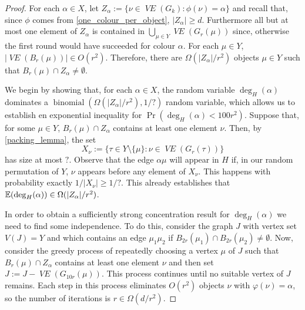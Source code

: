 \documentclass{patmorin}
\DeclareMathOperator{\binomial}{binomial}
\DeclareMathOperator{\VE}{\mathit{VE}}
\begin{document}
\begin{proof}
  For each $\alpha\in X$, let $Z_\alpha:=\{\nu\in\VE(G_k):\phi(\nu)=\alpha\}$ and recall that, since $\phi$ comes from \cref{one_colour_per_object}, $|Z_\alpha| \ge d$.  Furthermore all but at most one element of $Z_\alpha$ is contained in $\bigcup_{\mu\in Y}\VE(G_r(\mu))$ since, otherwise the first round would have succeeded for colour $\alpha$.  For each $\mu\in Y$, $|\VE(B_r(\mu))|\in O(r^2)$. Therefore, there are $\Omega(|Z_\alpha|/r^2)$ objects $\mu\in Y$ such that $B_r(\mu)\cap Z_\alpha\neq\emptyset$.

  We begin by showing that, for each $\alpha\in X$, the random variable $\deg_H(\alpha)$ dominates a $\binomial(\Omega(|Z_\alpha|/r^2),1/?)$ random variable, which allows us to establish en exponential inequality for $\Pr(\deg_H(\alpha) < 100r^2)$.
  Suppose that, for some $\mu\in Y$, $B_r(\mu)\cap Z_\alpha$ contains at least one element $\nu$. Then, by \cref{packing_lemma}, the set
  \[
     X_\nu := \{\tau\in Y\setminus\{\mu\}:\nu\in\VE(G_r(\tau))\}
  \]
  has size at most $?$. Observe that the edge $\alpha\mu$ will appear in $H$ if, in our random permutation of $Y$, $\nu$ appears before any element of $X_\nu$.  This happens with probability exactly $1/|X_\nu|\ge 1/?$.  This already establishes that $\mathbb{E}(\deg_H(\alpha)) \in \Omega(|Z_\alpha|/r^2)$.

  In order to obtain a sufficiently strong concentration result for $\deg_H(\alpha)$ we need to find some independence.  To do this, consider the graph $J$ with vertex set $V(J)=Y$ and which contains an edge $\mu_1\mu_2$ if $B_{2r}(\mu_1)\cap B_{2r}(\mu_2)\neq\emptyset$.  Now, consider the greedy process of repeatedly choosing a vertex $\mu$ of $J$ such that $B_r(\mu)\cap Z_\alpha$ contains at least one element $\nu$ and then set $J:=J-\VE(G_{10r}(\mu))$.  This process continues until no suitable vertex of $J$ remains.  Each step in this process eliminates $O(r^2)$ objects $\nu$ with $\varphi(\nu)=\alpha$, so the number of iterations is $r\in\Omega(d/r^2)$.


\end{proof}
\end{document}
